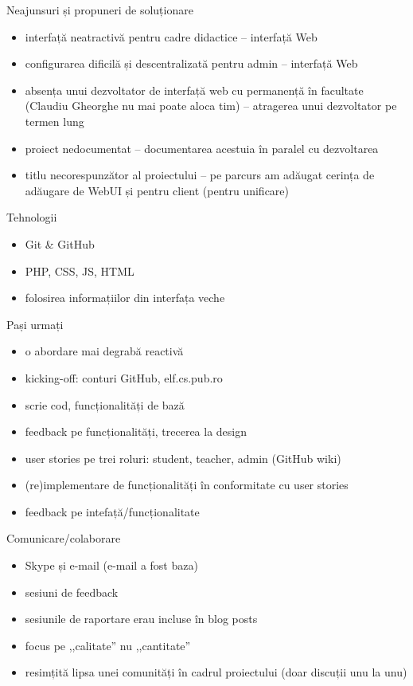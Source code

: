 \documentclass{beamer}
\begin{document}
\begin{frame}{Neajunsuri și propuneri de soluționare}
  \begin{itemize}
    \item interfață neatractivă pentru cadre didactice -- interfață Web
    \item configurarea dificilă și descentralizată pentru admin -- interfață
      Web
    \item absența unui dezvoltator de interfață web cu permanență în
      facultate (Claudiu Gheorghe nu mai poate aloca tim) -- atragerea unui
      dezvoltator pe termen lung
    \item proiect nedocumentat -- documentarea acestuia în paralel cu
      dezvoltarea
    \item titlu necorespunzător al proiectului -- pe parcurs am adăugat
      cerința de adăugare de WebUI și pentru client (pentru unificare)
  \end{itemize}
\end{frame}

\begin{frame}{Tehnologii}
  \begin{itemize}
    \item Git \& GitHub
    \item PHP, CSS, JS, HTML
    \item folosirea informațiilor din interfața veche
  \end{itemize}
\end{frame}

\begin{frame}{Pași urmați}
  \begin{itemize}
    \item o abordare mai degrabă reactivă
    \item kicking-off: conturi GitHub, elf.cs.pub.ro
    \item scrie cod, funcționalități de bază
    \item feedback pe funcționalități, trecerea la design
    \item user stories pe trei roluri: student, teacher, admin (GitHub wiki)
    \item (re)implementare de funcționalități în conformitate cu user stories
    \item feedback pe intefață/funcționalitate
  \end{itemize}
\end{frame}

\begin{frame}{Comunicare/colaborare}
  \begin{itemize}
    \item Skype și e-mail (e-mail a fost baza)
    \item sesiuni de feedback
    \item sesiunile de raportare erau incluse în blog posts
    \item focus pe ,,calitate'' nu ,,cantitate''
    \item resimțită lipsa unei comunități în cadrul proiectului (doar discuții
      unu la unu)
  \end{itemize}
\end{frame}
\end{document}
